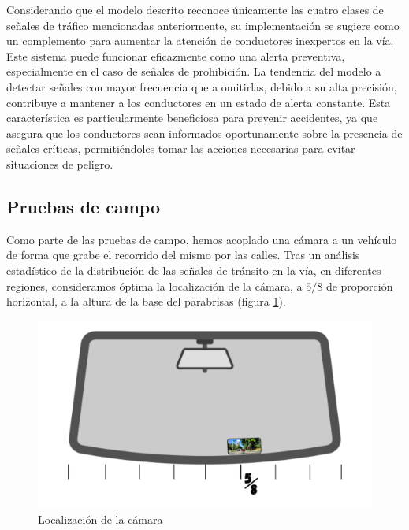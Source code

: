 \documentclass{article}
\begin{document}
Considerando que el modelo descrito reconoce únicamente las cuatro clases de señales de tráfico mencionadas anteriormente, su implementación se sugiere como un complemento para aumentar la atención de conductores inexpertos en la vía. Este sistema puede funcionar eficazmente como una alerta preventiva, especialmente en el caso de señales de prohibición. La tendencia del modelo a detectar señales con mayor frecuencia que a omitirlas, debido a su alta precisión, contribuye a mantener a los conductores en un estado de alerta constante. Esta característica es particularmente beneficiosa para prevenir accidentes, ya que asegura que los conductores sean informados oportunamente sobre la presencia de señales críticas, permitiéndoles tomar las acciones necesarias para evitar situaciones de peligro.

\subsection{Pruebas de campo}

Como parte de las pruebas de campo, hemos acoplado una cámara a un vehículo de forma que grabe el recorrido del mismo por las calles. Tras un análisis estadístico de la distribución de las señales de tránsito en la vía, en diferentes regiones, consideramos óptima la localización de la cámara, a $5/8$ de proporción horizontal, a la altura de la base del parabrisas (figura \ref{fig:windshield}).

\begin{figure}[h]
\centering
\includegraphics[width=0.9 \textwidth]{resources/windshield.png}
\caption{Localización de la cámara}
\label{fig:windshield}
\end{figure}
\end{document}
